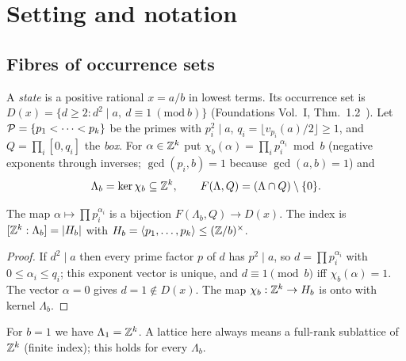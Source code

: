 \section{Setting and notation}\label{sec:setting}

\subsection{Fibres of occurrence sets}
A \emph{state} is a positive rational $x=a/b$ in lowest terms. Its occurrence set is $D(x)=\{d\ge2: d^2\mid a,\ d\equiv1\ (\mathrm{mod}\ b)\}$ (Foundations Vol.~I, Thm.~1.2~\cite{FoundI}). Let $\mathcal P=\{p_1<\dots<p_k\}$ be the primes with $p_i^2\mid a$, $q_i=\lfloor v_{p_i}(a)/2\rfloor\ge1$, and $Q=\prod_{i}[0,q_i]$ the \emph{box}. For $\alpha\in\mathbb Z^k$ put $\chi_b(\alpha)=\prod_i p_i^{\alpha_i}\bmod b$ (negative exponents through inverses; $\gcd(p_i,b)=1$ because $\gcd(a,b)=1$) and
\[
\Lambda_b=\ker\chi_b\subseteq\mathbb Z^k,\qquad F(\Lambda,Q)=(\Lambda\cap Q)\setminus\{0\}.
\]
\begin{proposition}[fibre]\label{prop:fibre}
The map $\alpha\mapsto\prod p_i^{\alpha_i}$ is a bijection $F(\Lambda_b,Q)\to D(x)$. The index is $[\mathbb Z^k:\Lambda_b]=|H_b|$ with $H_b=\langle p_1,\dots,p_k\rangle\le(\mathbb Z/b)^\times$.
\end{proposition}
\begin{proof}
If $d^2\mid a$ then every prime factor $p$ of $d$ has $p^2\mid a$, so $d=\prod p_i^{\alpha_i}$ with $0\le\alpha_i\le q_i$; this exponent vector is unique, and $d\equiv1\pmod b$ iff $\chi_b(\alpha)=1$. The vector $\alpha=0$ gives $d=1\notin D(x)$. The map $\chi_b:\mathbb Z^k\to H_b$ is onto with kernel $\Lambda_b$. \qedhere
\end{proof}
For $b=1$ we have $\Lambda_1=\mathbb Z^k$. A lattice here always means a full-rank sublattice of $\mathbb Z^k$ (finite index); this holds for every $\Lambda_b$.

